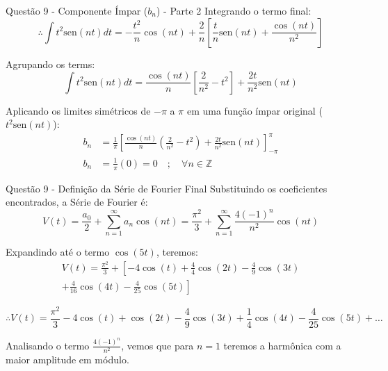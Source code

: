 \documentclass[8pt,aspectratio = 169]{beamer}
\begin{document}
\begin{frame}{Questão 9 - Componente Ímpar ($b_n$) - Parte 2}
    Integrando o termo final:
    \begin{equation*}
        \therefore \int t^2 \text{sen}(nt) dt = -\frac{t^2}{n} \cos(nt) + \frac{2}{n} \left[ \frac{t}{n} \text{sen}(nt) + \frac{\cos(nt)}{n^2} \right]
    \end{equation*}
    
    Agrupando os terms:
    \begin{equation*}
        \int t^2 \text{sen}(nt) dt = \frac{\cos(nt)}{n} \left[ \frac{2}{n^2} - t^2 \right] + \frac{2t}{n^2} \text{sen}(nt)
    \end{equation*}
    
    Aplicando os limites simétricos de $-\pi$ a $\pi$ em uma função ímpar original ($t^2 \text{sen}(nt)$):
    \begin{align*}
        b_n &= \frac{1}{\pi} \left[ \frac{\cos(nt)}{n} \left( \frac{2}{n^2} - t^2 \right) + \frac{2t}{n^2} \text{sen}(nt) \right]_{-\pi}^{\pi} \\[10pt]
        b_n &= \frac{1}{\pi} ( 0 ) = 0 \quad ; \quad \forall n \in \mathbb{Z}
    \end{align*}
\end{frame}

\begin{frame}{Questão 9 - Definição da Série de Fourier Final}
    Substituindo os coeficientes encontrados, a Série de Fourier é:
    \begin{equation*}
        V(t) = \frac{a_0}{2} + \sum_{n=1}^{\infty} a_n \cos(nt) = \frac{\pi^2}{3} + \sum_{n=1}^{\infty} \frac{4(-1)^n}{n^2} \cos(nt)
    \end{equation*}
    
    Expandindo até o termo $\cos(5t)$, teremos:
    \begin{multline*}
        V(t) = \frac{\pi^2}{3} + \left[ -4 \cos(t) + \frac{4}{4} \cos(2t) - \frac{4}{9} \cos(3t) \right. \\
        \left. + \frac{4}{16} \cos(4t) - \frac{4}{25} \cos(5t) \right]
    \end{multline*}
    
    \begin{equation*}
        \therefore V(t) = \frac{\pi^2}{3} - 4 \cos(t) + \cos(2t) - \frac{4}{9} \cos(3t) + \frac{1}{4} \cos(4t) - \frac{4}{25} \cos(5t) + \dots
    \end{equation*}
    
    \vspace{0.3cm}
    Analisando o termo $\frac{4(-1)^n}{n^2}$, vemos que para $n=1$ teremos a harmônica com a maior amplitude em módulo.
\end{frame}
\end{document}
